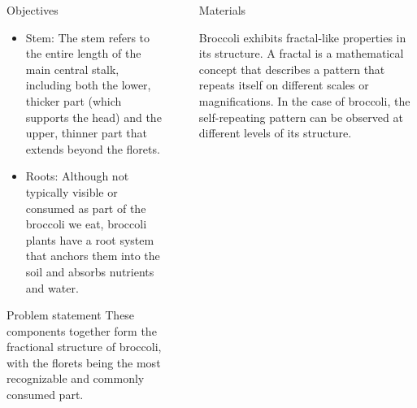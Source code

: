 \documentclass{beamer}
\begin{document}
\begin{frame}[t]
\begin{columns}[t]
\begin{column}{\onecolwid}
\begin{alertblock}{Objectives}
\begin{itemize}
    	\item Stem: The stem refers to the entire length of the main central stalk, including both the lower, thicker part (which supports the head) and the upper, thinner part that extends beyond the florets.

    	\item Roots: Although not typically visible or consumed as part of the broccoli we eat, broccoli plants have a root system that anchors them into the soil and absorbs nutrients and water.
    \end{itemize}
    
    \end{alertblock}
    
    \begin{block}{Problem statement}
    These components together form the fractional structure of broccoli, with the florets being the most recognizable and commonly consumed part.
    \end{block}
    
    
    \end{column} %
    
    \begin{column}{\sepwid}\end{column} %
    
    \begin{column}{\twocolwid} %
    
    \begin{columns}[t,totalwidth=\twocolwid] %
    
    \begin{column}{\onecolwid}\vspace{-.6in} %
    
    
    \begin{block}{Materials}
    
     Broccoli exhibits fractal-like properties in its structure. A fractal is a mathematical concept that describes a pattern that repeats itself on different scales or magnifications. In the case of broccoli, the self-repeating pattern can be observed at different levels of its structure.
     

\end{block}
\end{column}
\end{columns}
\end{column}
\end{columns}
\end{frame}
\end{document}
